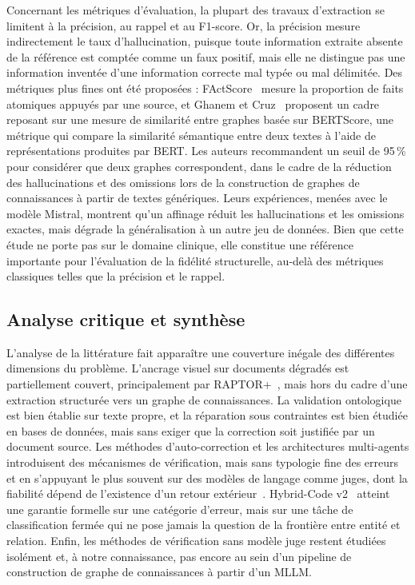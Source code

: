 Concernant les métriques d'évaluation, la plupart des travaux d'extraction se limitent à la précision, au rappel et au F1-score. Or, la précision mesure indirectement le taux d'hallucination, puisque toute information extraite absente de la référence est comptée comme un faux positif, mais elle ne distingue pas une information inventée d'une information correcte mal typée ou mal délimitée. Des métriques plus fines ont été proposées : FActScore~\cite{min2023factscore} mesure la proportion de faits atomiques appuyés par une source, et Ghanem et Cruz~\cite{ghanem2024enhancing} proposent un cadre reposant sur une mesure de similarité entre graphes basée sur BERTScore, une métrique qui compare la similarité sémantique entre deux textes à l'aide de représentations produites par BERT. Les auteurs recommandent un seuil de 95\,\% pour considérer que deux graphes correspondent, dans le cadre de la réduction des hallucinations et des omissions lors de la construction de graphes de connaissances à partir de textes génériques. Leurs expériences, menées avec le modèle Mistral, montrent qu'un affinage réduit les hallucinations et les omissions exactes, mais dégrade la généralisation à un autre jeu de données. Bien que cette étude ne porte pas sur le domaine clinique, elle constitue une référence importante pour l'évaluation de la fidélité structurelle, au-delà des métriques classiques telles que la précision et le rappel.

\subsection{Analyse critique et synthèse}

L'analyse de la littérature fait apparaître une couverture inégale des différentes dimensions du problème. L'ancrage visuel sur documents dégradés est partiellement couvert, principalement par RAPTOR+~\cite{raptorplus2026}, mais hors du cadre d'une extraction structurée vers un graphe de connaissances. La validation ontologique est bien établie sur texte propre, et la réparation sous contraintes est bien étudiée en bases de données, mais sans exiger que la correction soit justifiée par un document source. Les méthodes d'auto-correction et les architectures multi-agents introduisent des mécanismes de vérification, mais sans typologie fine des erreurs et en s'appuyant le plus souvent sur des modèles de langage comme juges, dont la fiabilité dépend de l'existence d'un retour extérieur~\cite{kamoi2024selfcorrection}. Hybrid-Code v2~\cite{hybrid2512v2} atteint une garantie formelle sur une catégorie d'erreur, mais sur une tâche de classification fermée qui ne pose jamais la question de la frontière entre entité et relation. Enfin, les méthodes de vérification sans modèle juge restent étudiées isolément et, à notre connaissance, pas encore au sein d'un pipeline de construction de graphe de connaissances à partir d'un MLLM.

